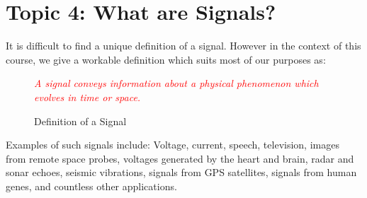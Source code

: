 \documentclass[a4paper,12pt]{report}
\begin{document}
\section{Topic 4: What are Signals?}
It is difficult to find a unique definition of a signal. However in the context of this course, we give a workable definition which suits most of our purposes as:
\begin{figure}[H]
    \centering
    \begin{mdframed}
        \begin{center}
            \textcolor{red}{%
                \emph{A signal conveys information about a physical phenomenon which evolves in time or space.}}
        \end{center}
    \end{mdframed}\label{fig:signal-def-1}
    \vspace{-1em}\caption{Definition of a Signal}
\end{figure}
\vspace{-1em}
\noindent Examples of such signals include: Voltage, current, speech, television, images from remote space probes, voltages generated by the heart and brain, radar and sonar echoes, seismic vibrations, signals from GPS satellites, signals from human genes, and countless other applications.
\end{document}
